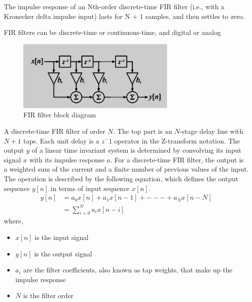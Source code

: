 \documentclass[conference]{IEEEtran}
\begin{document}
The impulse response of an Nth-order discrete-time FIR filter (i.e., with a Kronecker delta impulse input) lasts for N + 1 samples, and then settles to zero.

FIR filters can be discrete-time or continuous-time, and digital or analog
\begin{figure}[!h]
	\begin{center} 
	    \includegraphics[width=0.8\columnwidth]{figs/FIR}
	\end{center}
\caption{FIR filter block diagram}
\label{fig:Fig1}
\end{figure}

A discrete-time FIR filter of order $N$. The top part is an $N$-stage delay line with $N+1$ taps. Each unit delay is a $z^-1$ operator in the Z-transform notation. The output $y$ of a linear time invariant system is determined by convolving its input signal $x$ with its impulse response $a$. For a discrete-time FIR filter, the output is a weighted sum of the current and a finite number of previous values of the input. The operation is described by the following equation, which defines the output sequence $y[n]$ in terms of input sequence $x[n]$.
\begin{align}
y[n] &= a_0x[n]+a_1x[n-1]+---+a_Nx[n-N]\\
 	 &= \sum_{i=0}^{N}a_ix[n-i] 
\end{align} 
where,
\begin{itemize}
\item $x[n]$ is the input signal
\item $y[n]$ is the output signal
\item $a_i$ are the filter coefficients, also known as tap weights, that make up the impulse response
\item $N$ is the filter order
\end{itemize}
\end{document}
